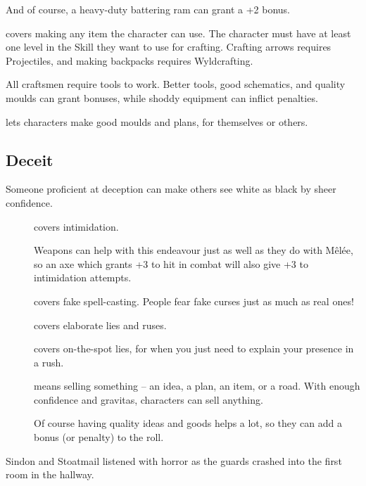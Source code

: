 \begin{multicols}{2}
\begin{description}
    And of course, a heavy-duty battering ram can grant a +2 bonus.
  \item[\roll{Dexterity}{Crafts}]
    covers making any item the character can use.
    The character must have at least one level in the Skill they want to use for crafting.
    Crafting arrows requires Projectiles, and making backpacks requires Wyldcrafting.

    All craftsmen require tools to work.
    Better tools, good schematics, and quality moulds can grant bonuses, while shoddy equipment can inflict penalties.
  \item[\roll{Intelligence}{Crafts}]
    lets characters make good moulds and plans, for themselves or others.
\end{description}

\subsection{Deceit}

Someone proficient at deception can make others see white as black by sheer confidence.

\begin{description}
  \item[]
    covers intimidation.

    Weapons can help with this endeavour just as well as they do with M\^{e}l\'ee, so an axe which grants +3 to hit in combat will also give +3 to intimidation attempts.
  \item[]
    covers fake spell-casting.
    People fear fake curses just as much as real ones!
  \item[]
    covers elaborate lies and ruses.
  \item[]
    covers on-the-spot lies, for when you just need to explain your presence in a rush.
  \item[]
    means selling something -- an idea, a plan, an item, or a road.
    With enough confidence and gravitas, characters can sell anything.

    Of course having quality ideas and goods helps a lot, so they can add a bonus (or penalty) to the roll.
\end{description}


\begin{exampletext}
  Sindon and Stoatmail listened with horror as the guards crashed into the first room in the hallway.


\end{exampletext}
\end{multicols}
